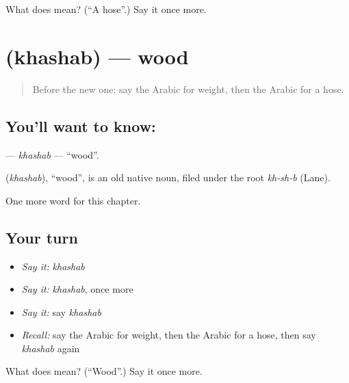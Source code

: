 \begin{tcolorbox}[breakable,colback=teal!4,colframe=teal!35!black,title={Before you move on}]
What does  mean? (\textquotedblleft{}A hose\textquotedblright{}.) Say it once more.
\end{tcolorbox}
\section[\texorpdfstring{\ar{خشب} (khashab)}{خشب (khashab)}]{ (khashab) — wood}

\label{lesson:AR-C219-khashab}



\begin{quote}
Before the new one: say the Arabic for weight, then the Arabic for a hose.
\end{quote}

\subsection*{You'll want to know: }
\textbf{} — \emph{khashab} — \textquotedblleft{}wood\textquotedblright{}.

\begin{cousinweb}
\textbf{} (\emph{khashab}), \textquotedblleft{}wood\textquotedblright{}, is an old native noun, filed under the root \emph{kh-sh-b} (Lane).
\end{cousinweb}

\begin{grammarlens}[title={What you've built}]
One more word for this chapter.
\end{grammarlens}

\subsection*{Your turn}
\begin{itemize}
\raggedright
  \item \emph{Say it:} \emph{khashab}
  \item \emph{Say it:} \emph{khashab}, once more
  \item \emph{Say it:} say \emph{khashab}
  \item \emph{Recall:} say the Arabic for weight, then the Arabic for a hose, then say \emph{khashab} again
\end{itemize}

\begin{tcolorbox}[breakable,colback=teal!4,colframe=teal!35!black,title={Before you move on}]
What does  mean? (\textquotedblleft{}Wood\textquotedblright{}.) Say it once more.
\end{tcolorbox}
